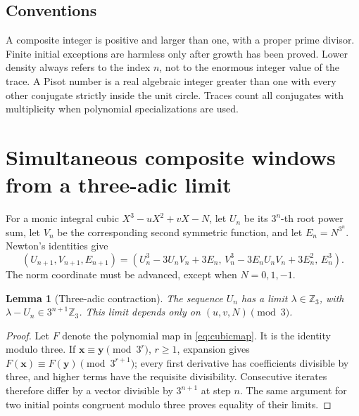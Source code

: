 \documentclass[11pt,a4paper]{article}
\newtheorem{lemma}[theorem]{Lemma}
\theoremstyle{remark}\newtheorem{remark}[theorem]{Remark}
\newcommand{\Z}{\mathbb Z}\newcommand{\Q}{\mathbb Q}
\begin{document}
\subsection{Conventions}
A composite integer is positive and larger than one, with a proper
prime divisor. Finite initial exceptions are harmless only after
growth has been proved. Lower density always refers to the index
$n$, not to the enormous integer value of the trace. A Pisot number
is a real algebraic integer greater than one with every other
conjugate strictly inside the unit circle. Traces count all conjugates
with multiplicity when polynomial specializations are used.


\section{Simultaneous composite windows from a three-adic limit}\label{sec:windows}
For a monic integral cubic $X^3-uX^2+vX-N$, let $U_n$ be its
$3^n$-th root power sum, let $V_n$ be the corresponding second
symmetric function, and let $E_n=N^{3^n}$. Newton's identities give
\begin{equation}\label{eq:cubicmap}
 (U_{n+1},V_{n+1},E_{n+1})=
 (U_n^3-3U_nV_n+3E_n,\,
 V_n^3-3E_nU_nV_n+3E_n^2,\,E_n^3).
\end{equation}
The norm coordinate must be advanced, except when $N=0,1,-1$.

\begin{lemma}[Three-adic contraction]\label{lem:contraction}
The sequence $U_n$ has a limit $\lambda\in\Z_3$, with
$\lambda-U_n\in3^{n+1}\Z_3$. This limit depends only on
$(u,v,N)\pmod3$.
\end{lemma}
\begin{proof}
Let $F$ denote the polynomial map in \eqref{eq:cubicmap}. It is the
identity modulo three. If $\mathbf x\equiv\mathbf y\pmod{3^r}$,
$r\ge1$, expansion gives
$F(\mathbf x)\equiv F(\mathbf y)\pmod{3^{r+1}}$; every first
derivative has coefficients divisible by three, and higher terms
have the requisite divisibility. Consecutive iterates therefore
differ by a vector divisible by $3^{n+1}$ at step $n$. The same
argument for two initial points congruent modulo three proves
equality of their limits.
\end{proof}
\end{document}
